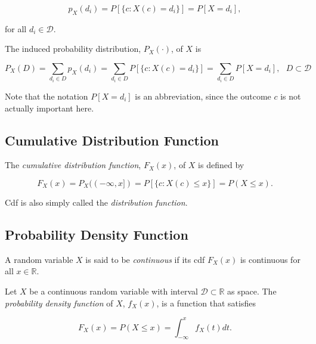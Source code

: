 \documentclass{article}
\begin{document}
            \begin{equation*}
                p_{X}(d_{i}) = P[\{ c: X(c) = d_{i} \}] = P[ X = d_{i} ],
            \end{equation*}

            for all $ d_{i} \in \mathcal{D} $.

            The induced probability distribution, $ P_{X}(\cdot) $, of $ X $ is

            \begin{equation*}
                P_{X}(D) = \sum_{ d_{i} \in D} p_{X}(d_{i}) = \sum_{ d_{i} \in
                D} P[\{ c: X(c) = d_{i} \}] = \sum_{d_{i} \in D} P[ X = d_{i}],
                \text{ } D \subset \mathcal{D}
            \end{equation*}

            Note that the notation $ P[ X = d_{i}] $ is an abbreviation, since
            the outcome $ c $ is not actually important here.

        \subsection{Cumulative Distribution Function}

            The \textit{cumulative distribution function}, $ F_{X}(x) $, of $ X
            $ is defined by

            \begin{equation*}
                F_{X}(x) = P_{X}((-\infty, x]) = P[\{ c: X(c) \leq x \}] = P (
                { X \leq x } ).
            \end{equation*}

            Cdf is also simply called the \textit{distribution function}.

        \subsection{Probability Density Function}

            A random variable $ X $ is said to be \textit{continuous} if
            its cdf $ F_{X}(x) $ is continuous for all $ x \in \mathbb{R} $.

            Let $ X $ be a continuous random variable with interval $
            \mathcal{D} \subset \mathbb{R} $ as space. The \textit{probability
            density function} of $ X $, $ f_{X}(x) $, is a function that
            satisfies

            \begin{equation*}
                F_{X}(x) = P(X \leq x) = \int_{-\infty}^{x} f_{X}(t) dt.
            \end{equation*}
\end{document}
